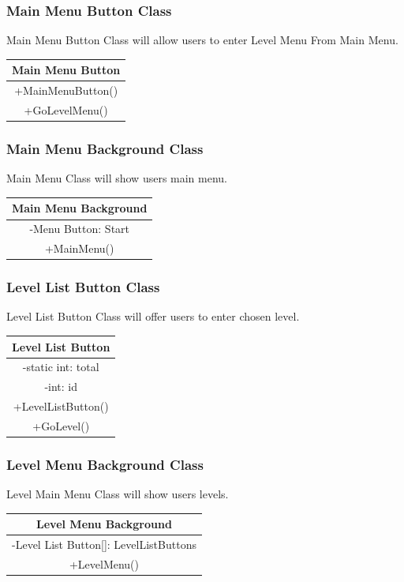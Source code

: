 \subsubsection{Main Menu Button Class}
Main Menu Button Class will allow users to enter Level Menu From Main Menu.
\begin{center}\begin{tabular}{ |c| } \hline Main Menu Button \\ \hline +MainMenuButton() \\ +GoLevelMenu()\\ \hline \end{tabular}\end{center}

\subsubsection{Main Menu Background Class}
Main Menu Class will show users main menu. 
\begin{center}\begin{tabular}{ |c| } \hline Main Menu Background \\ \hline -Menu Button: Start \\ \hline +MainMenu() \\ \hline \end{tabular}\end{center}

\subsubsection{Level List Button Class}
Level List Button Class will offer users to enter chosen level.
\begin{center}\begin{tabular}{ |c| } \hline Level List Button \\ \hline -static int: total \\ -int: id \\ \hline +LevelListButton() \\ +GoLevel() \\ \hline \end{tabular}\end{center}

\subsubsection{Level Menu Background Class}
Level Main Menu Class will show users levels.
\begin{center}\begin{tabular}{ |c| } \hline Level Menu Background \\ \hline -Level List Button[]: LevelListButtons \\ \hline +LevelMenu() \\ \hline \end{tabular}\end{center}


